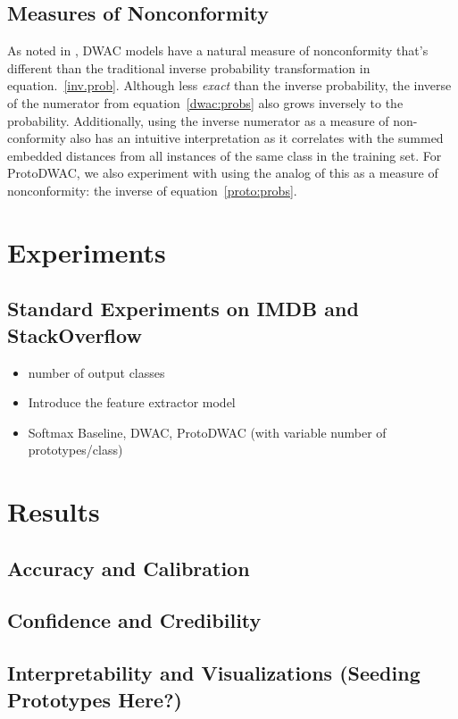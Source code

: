 \documentclass[11pt,letterpaper]{article}
\begin{document}
\subsection{Measures of Nonconformity}
As noted in \cite{card.2019}, DWAC models have a natural measure of nonconformity that's different than the traditional inverse probability transformation in equation.~\ref{inv.prob}. Although less \textit{exact} than the inverse probability, the inverse of the numerator from equation~\ref{dwac:probs} also grows inversely to the probability. Additionally, using the inverse numerator as a measure of non-conformity also has an intuitive interpretation as it correlates with the summed embedded distances from all instances of the same class in the training set. For ProtoDWAC, we also experiment with using the analog of this as a measure of nonconformity: the inverse of equation~\ref{proto:probs}.



\section{Experiments}
\subsection{Standard Experiments on IMDB and StackOverflow}
\begin{itemize}
  \item number of output classes
  \item Introduce the feature extractor model \citet{mullenbach.2018}
  \item Softmax Baseline, DWAC, ProtoDWAC (with variable number of prototypes/class)
\end{itemize}

\section{Results}
\subsection{Accuracy and Calibration}
\subsection{Confidence and Credibility}
\subsection{Interpretability and Visualizations (Seeding Prototypes Here?)}
\end{document}
